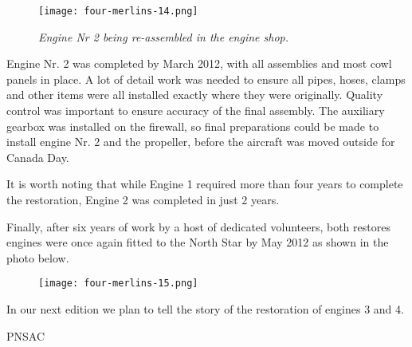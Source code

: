\begin{figure}[htbp]
   \vspace{2em}
   \centering
   \texttt{[image: four-merlins-14.png]}
   \caption*{\small \em  Engine Nr 2 being re-assembled in the engine shop.}
   \label{fig:tim}
\end{figure}

Engine Nr. 2 was completed by March 2012, with all assemblies and most cowl
panels in place.  A lot of detail work was needed to ensure all pipes, hoses,
clamps and other items were all installed exactly where they were originally. 
Quality control was important to ensure accuracy of the final assembly.  The
auxiliary gearbox was installed on the firewall, so final preparations could be
made  to install engine  Nr. 2 and the propeller, before the aircraft was moved
outside for Canada Day.

It is worth noting that while Engine 1 required more than four years to
complete the restoration, Engine 2 was completed in just 2 years.

Finally, after six years of work by a host of dedicated volunteers, both
restores engines were once again fitted to the North Star by May 2012 as shown
in the photo below.

\begin{figure}[htbp]
   \vspace{2em}
   \centering
   \texttt{[image: four-merlins-15.png]}
   \label{fig:tim}
\end{figure}

In our next edition we plan to tell the story of the restoration of engines 3
and 4.

\begin{footnotesize}
    \raggedleft PNSAC\\
\end{footnotesize}




